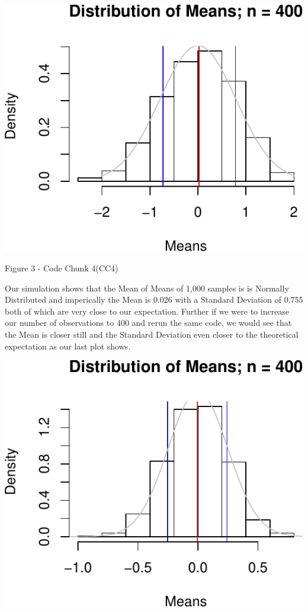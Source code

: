 \documentclass[]{article}
\begin{document}
\includegraphics{06_Project1a_files/figure-latex/CLT_Samples-1.pdf}

Figure 3 - Code Chunk 4(CC4)

Our simulation shows that the Mean of Means of 1,000 samples is is
Normally Distributed and imperically the Mean is 0.026 with a Standard
Deviation of 0.755 both of which are very close to our expectation.
Further if we were to increase our number of observations to 400 and
rerun the same code, we would see that the Mean is closer still and the
Standard Deviation even closer to the theoretical expectation as our
last plot shows.

\includegraphics{06_Project1a_files/figure-latex/CLT_Samples400-1.pdf}
\end{document}
